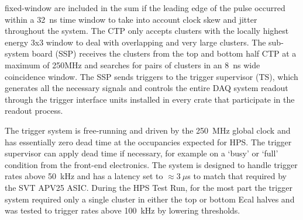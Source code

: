 \documentclass[final,3p,times,twocolumn]{elsarticle}
\begin{document}
fixed-window are included in the sum if the leading edge of the pulse occurred within a 32~ns time 
window to take into account clock skew and jitter throughout the system.
The CTP only accepts clusters with the locally highest energy 3x3 window to deal with overlapping and 
very large clusters. The sub-system board (SSP) receives the clusters from the top and bottom half CTP 
at a maximum of 250MHz and searches for pairs of clusters in an 8~ns wide coincidence window. The 
SSP sends triggers to the trigger supervisor (TS), which generates all the necessary signals and 
controls the entire DAQ system readout through the trigger interface units installed in every crate that 
participate in the readout process.

The trigger system is free-running and driven by the 250~MHz global clock and has essentially zero 
dead time at the occupancies expected for HPS. The trigger supervisor can apply dead time if 
necessary, for example on a `busy' or `full' condition from the front-end electronics. The system is 
designed to handle trigger rates above 50~kHz and has a latency set to $\approx 3~\mu$s to match 
that required by the SVT APV25 ASIC. During the HPS Test Run, for the most part the trigger system 
required only a single cluster in either the top or bottom Ecal halves and was tested to trigger rates 
above 100~kHz by lowering thresholds. 
\end{document}
